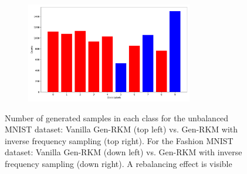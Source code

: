 \begin{figure}[H]
\begin{subfigure}{0.45\textwidth}
    \end{subfigure}
    \hfill
    \begin{subfigure}{0.45\textwidth}
        \centering
        \includegraphics[width=0.8\textwidth]{Figures/Methods/dis_ubfs_inw.png}
    \end{subfigure}
    \caption{Number of generated samples in each class for the unbalanced MNIST dataset: Vanilla Gen-RKM (top left) vs. Gen-RKM with inverse frequency sampling (top right). For the Fashion MNIST dataset: Vanilla Gen-RKM (down left) vs. Gen-RKM with inverse frequency sampling (down right). A rebalancing eﬀect is visible}
    \label{dis-ub09}
\end{figure}



